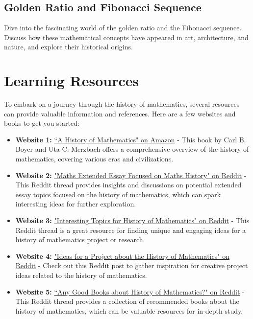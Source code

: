 \documentclass{article}
\begin{document}
\subsection{Golden Ratio and Fibonacci Sequence}
Dive into the fascinating world of the golden ratio and the Fibonacci sequence. Discuss how these mathematical concepts have appeared in art, architecture, and nature, and explore their historical origins.

\section{Learning Resources}
To embark on a journey through the history of mathematics, several resources can provide valuable information and references. Here are a few websites and books to get you started:

\begin{itemize}
  \item \textbf{Website 1:} \href{http://rads.stackoverflow.com/amzn/click/0470525487}{``A History of Mathematics" on Amazon} - This book by Carl B. Boyer and Uta C. Merzbach offers a comprehensive overview of the history of mathematics, covering various eras and civilizations.
  
  \item \textbf{Website 2:} \href{https://www.reddit.com/r/IBO/comments/doyfyu/maths_extended_essay_focused_on_maths_history/}{"Maths Extended Essay Focused on Maths History" on Reddit} - This Reddit thread provides insights and discussions on potential extended essay topics focused on the history of mathematics, which can spark interesting ideas for further exploration.
  
  \item \textbf{Website 3:} \href{https://www.reddit.com/r/math/comments/sbs4pf/i_need_an_interesting_topic_for_my_history_of/}{"Interesting Topics for History of Mathematics" on Reddit} - This Reddit thread is a great resource for finding unique and engaging ideas for a history of mathematics project or research.
  
  \item \textbf{Website 4:} \href{https://www.reddit.com/r/askmath/comments/17z542s/i_need_ideas_for_a_project_about_history_of/}{"Ideas for a Project about the History of Mathematics" on Reddit} - Check out this Reddit post to gather inspiration for creative project ideas related to the history of mathematics.
  
  \item \textbf{Website 5:} \href{https://www.reddit.com/r/math/comments/bfggu1/any_good_books_about_history_of_mathematics/}{``Any Good Books about History of Mathematics?" on Reddit} - This Reddit thread provides a collection of recommended books about the history of mathematics, which can be valuable resources for in-depth study.
\end{itemize}
\end{document}
